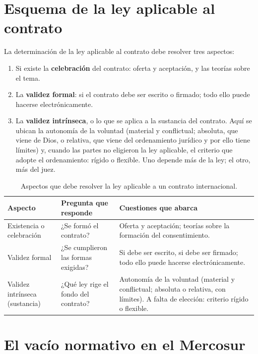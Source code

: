 \documentclass[12pt,oneside]{book}
\begin{document}
\section{Esquema de la ley aplicable al contrato}

La determinación de la ley aplicable al contrato debe resolver tres aspectos:

\begin{enumerate}
    \item Si existe la \textbf{celebración} del contrato: oferta y aceptación, y las teorías sobre el tema.
    \item La \textbf{validez formal}: si el contrato debe ser escrito o firmado; todo ello puede hacerse electrónicamente.
    \item La \textbf{validez intrínseca}, o lo que se aplica a la sustancia del contrato. Aquí se ubican la autonomía de la voluntad (material y conflictual; absoluta, que viene de Dios, o relativa, que viene del ordenamiento jurídico y por ello tiene límites) y, cuando las partes no eligieron la ley aplicable, el criterio que adopte el ordenamiento: rígido o flexible. Uno depende más de la ley; el otro, más del juez.
\end{enumerate}

\begin{table}[H]
\centering
\small
\caption{Aspectos que debe resolver la ley aplicable a un contrato internacional.}
\begin{tabularx}{\textwidth}{>{\raggedright\arraybackslash}p{} Y Y}
\toprule
\textbf{Aspecto} & \textbf{Pregunta que responde} & \textbf{Cuestiones que abarca} \\
\midrule
Existencia o celebración & ¿Se formó el contrato? & Oferta y aceptación; teorías sobre la formación del consentimiento. \\
Validez formal & ¿Se cumplieron las formas exigidas? & Si debe ser escrito, si debe ser firmado; todo ello puede hacerse electrónicamente. \\
Validez intrínseca (sustancia) & ¿Qué ley rige el fondo del contrato? & Autonomía de la voluntad (material y conflictual; absoluta o relativa, con límites). A falta de elección: criterio rígido o flexible. \\
\bottomrule
\end{tabularx}
\end{table}

\section{El vacío normativo en el Mercosur}
\end{document}
